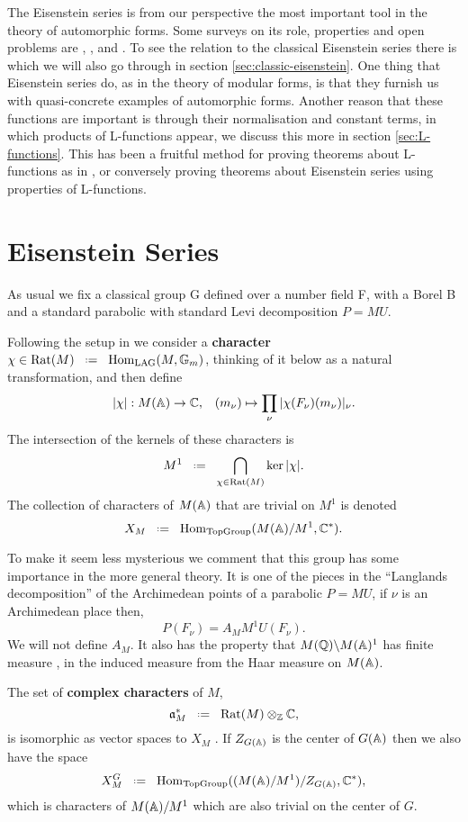 The Eisenstein series is from our perspective the most important tool in the theory of automorphic forms. Some surveys on its role, properties and open problems are \cite{lapidPerspectivesEisensteinSeries2022}, \cite{arthurEisensteinSeriesTrace1979}, \cite{kimEISENSTEINSERIESTHEIR} and \cite{jiangResiduesEisensteinSeries2008a}. To see the relation to the classical Eisenstein series there is \cite{garrettTransitionEisensteinSeries2016} which we will also go through in section \ref{sec:classic-eisenstein}. One thing that Eisenstein series do, as in the theory of modular forms, is that they furnish us with quasi-concrete examples of automorphic forms. Another reason that these functions are important is through their normalisation and constant terms, in which products of L-functions appear, we discuss this more in section \ref{sec:L-functions}. This has been a fruitful method for proving theorems about L-functions as in \cite{shahidiEisensteinSeriesAutomorphic2010}\cite{pollackRANKINSELBERGMETHODUSERS}\cite{arthurEisensteinSeriesTrace1979}, or conversely proving theorems about Eisenstein series \cite{jiangPolesCertainResidual2013} using properties of L-functions.

\section{Eisenstein Series}\label{sec:eisenstein-series}
As usual we fix a classical group G defined over a number field F, with a Borel B and a standard parabolic with standard Levi decomposition \(P = MU\). 

Following the setup in \cite[I.1.4]{moeglinSpectralDecompositionEisenstein1995} we consider a \textbf{character} \(\chi\in \mathrm{Rat}(M) \defeq \Hom_{\mathrm{LAG}}(M, \mathbb{G}_m)\), thinking of it below as a natural transformation, and then define 
\[|\chi|: M(\A)\to \C , \;\;\; (m_\nu)\mapsto \prod_\nu|\chi(F_\nu)(m_\nu)|_\nu.\]
The intersection of the kernels of these characters is 
\[M^1 \defeq \bigcap_{\chi\in \mathrm{Rat}(M)}\ker |\chi|.\]
The collection of characters of \(M(\A)\) that are trivial on \(M^1\) is denoted
\[X_M \defeq \Hom_{\textrm{TopGroup}}(M(\A)/M^1, \C^*) .\]

\begin{remark}
    To make it seem less mysterious we comment that this group has some importance in the more general theory. It is one of the pieces in the ``Langlands decomposition'' of the Archimedean points of a parabolic \(P = MU\), if \(\nu\) is an Archimedean place then,
    \[P(F_\nu) = A_M M^1U(F_\nu).\]
    We will not define \(A_M\).
    It also has the property that \(M(\Q)\backslash M(\A)^1\) has finite measure \cite[4.9]{getzIntroductionAutomorphicRepresentations2024}, in the induced measure from the Haar measure on \(M(\A)\).
\end{remark}
The set of \textbf{complex characters} of \(M\),
\[\mathfrak{a}_M^* \defeq \mathrm{Rat}(M)\tensor_\Z \C,\]
is isomorphic as \C vector spaces to \(X_M\) \cite[I.1.4]{moeglinSpectralDecompositionEisenstein1995}. If \(Z_{G(\A)}\) is the center of \(G(\A)\) then we also have the space 
\[X_M^G \defeq \Hom_{\textrm{TopGroup}}((M(\A)/M^1)/Z_{G(\A)}, \C^*),\]
which is characters of \(M(\A)/M^1\) which are also trivial on the center of \(G\).

